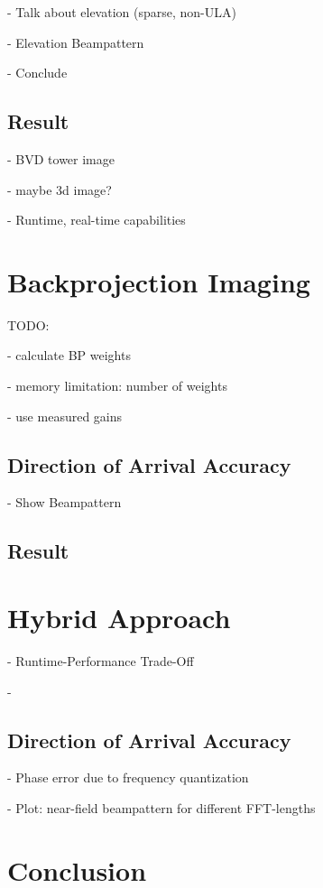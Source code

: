 - Talk about elevation (sparse, non-ULA)

- Elevation Beampattern

- Conclude


\subsection{Result}

- BVD tower image

- maybe 3d image?

- Runtime, real-time capabilities


\section{Backprojection Imaging}
TODO:

- calculate BP weights

- memory limitation: number of weights

- use measured gains

\subsection{Direction of Arrival Accuracy}

- Show Beampattern

\subsection{Result}


\section{Hybrid Approach}

- Runtime-Performance Trade-Off

-
\subsection{Direction of Arrival Accuracy}
- Phase error due to frequency quantization

- Plot: near-field beampattern for different FFT-lengths

\section{Conclusion}

